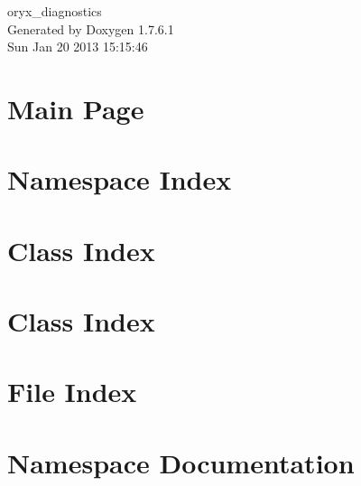 \documentclass[a4paper]{book}
\begin{document}
\begin{titlepage}
\vspace*{7cm}
\begin{center}
{\Large oryx\-\_\-diagnostics }\\
\vspace*{1cm}
{\large \-Generated by Doxygen 1.7.6.1}\\
\vspace*{0.5cm}
{\small Sun Jan 20 2013 15:15:46}\\
\end{center}
\end{titlepage}
\clearemptydoublepage
{}
\tableofcontents
\clearemptydoublepage
{}
\chapter{\-Main \-Page}
\label{index}
\chapter{\-Namespace \-Index}

\chapter{\-Class \-Index}

\chapter{\-Class \-Index}

\chapter{\-File \-Index}

\chapter{\-Namespace \-Documentation}












\end{document}
